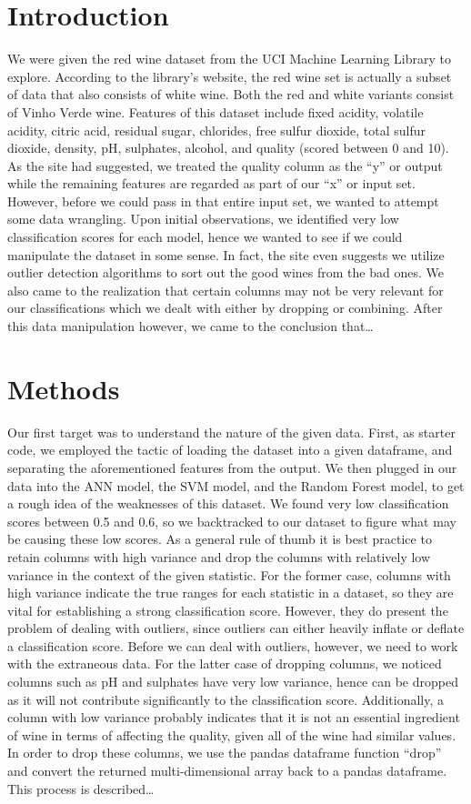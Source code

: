 \documentclass[conference]{IEEEtran}
\begin{document}
\section{Introduction}
We were given the red wine dataset from the UCI Machine Learning Library to explore. According to the library’s website, the red wine set is actually a subset of data that also consists of white wine. Both the red and white variants consist of Vinho Verde wine. Features of this dataset include fixed acidity, volatile acidity, citric acid, residual sugar, chlorides, free sulfur dioxide, total sulfur dioxide, density, pH, sulphates, alcohol, and quality (scored between 0 and 10). As the site had suggested, we treated the quality column as the “y” or output while the remaining features are regarded as part of our “x” or input set. However, before we could pass in that entire input set, we wanted to attempt some data wrangling. Upon initial observations, we identified very low classification scores for each model, hence we wanted to see if we could manipulate the dataset in some sense. In fact, the site even suggests we utilize outlier detection algorithms to sort out the good wines from the bad ones. We also came to the realization that certain columns may not be very relevant for our classifications which we dealt with either by dropping or combining. After this data manipulation however, we came to the conclusion that…

\section{Methods}
Our first target was to understand the nature of the given data. First, as starter code, we employed the tactic of loading the dataset into a given dataframe, and separating the aforementioned features from the output. We then plugged in our data into the ANN model, the SVM model, and the Random Forest model, to get a rough idea of the weaknesses of this dataset. We found very low classification scores between 0.5 and 0.6, so we backtracked to our dataset to figure what may be causing these low scores. As a general rule of thumb it is best practice to retain columns with high variance and drop the columns with relatively low variance in the context of the given statistic. For the former case, columns with high variance indicate the true ranges for each statistic in a dataset, so they are vital for establishing a strong classification score. However, they do present the problem of dealing with outliers, since outliers can either heavily inflate or deflate a classification score. Before we can deal with outliers, however, we need to work with the extraneous data. For the latter case of dropping columns, we noticed columns such as pH and sulphates have very low variance, hence can be dropped as it will not contribute significantly to the classification score. Additionally, a column with low variance probably indicates that it is not an essential ingredient of wine in terms of affecting the quality, given all of the wine had similar values. In order to drop these columns, we use the pandas dataframe function “drop” and convert the returned multi-dimensional array back to a pandas dataframe. This process is described…
\end{document}
